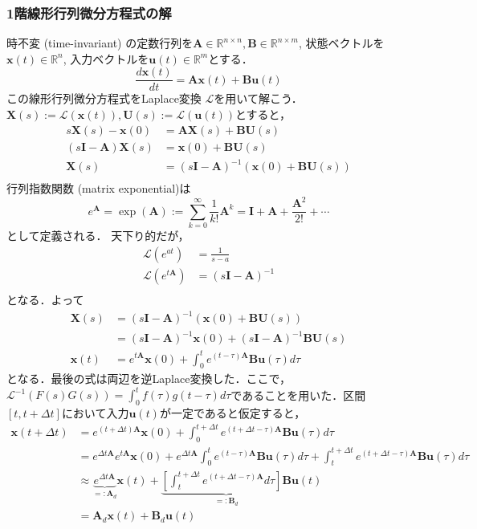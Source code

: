\subsubsection{1階線形行列微分方程式の解}時不変 (time-invariant) の定数行列を$\mathbf{A} \in \mathbb{R}^{n\times n}, \mathbf{B} \in \mathbb{R}^{n\times m}$, 状態ベクトルを$\mathbf{x}(t)\in\mathbb{R}^n$, 入力ベクトルを$\mathbf{u}(t)\in\mathbb{R}^m$とする．
$$
\frac{d\mathbf{x}(t)}{dt} = \mathbf{A}\mathbf{x}(t) + \mathbf{B}\mathbf{u}(t)
$$
この線形行列微分方程式をLaplace変換 $\mathcal{L}$を用いて解こう．$\boldsymbol{X}(s) := \mathcal{L}(\mathbf{x}(t)), \boldsymbol{U}(s) := \mathcal{L}(\mathbf{u}(t))$とすると，
$$
\begin{aligned}
s\boldsymbol{X}(s) - \mathbf{x}(0) &= \mathbf{A}\boldsymbol{X}(s)+ \mathbf{B}\boldsymbol{U}(s)\\
(s\mathbf{I} - \mathbf{A}) \boldsymbol{X}(s) &= \mathbf{x}(0) + \mathbf{B}\boldsymbol{U}(s)\\
\boldsymbol{X}(s) &= (s\mathbf{I} - \mathbf{A})^{-1}(\mathbf{x}(0) + \mathbf{B}\boldsymbol{U}(s))\\
\end{aligned}
$$
行列指数関数 (matrix exponential)は
$$
e^\mathbf{A} = \exp(\mathbf{A}) := \sum_{k=0}^\infty \frac{1}{k!}\mathbf{A}^k = \mathbf{I}+\mathbf{A}+\frac{\mathbf{A}^2}{2!}+\cdots
$$
として定義される．
天下り的だが，
$$
\begin{aligned}
\mathcal{L}(e^{at})&=\frac{1}{s-a}\\
\mathcal{L}(e^{t\mathbf{A}})&=(s\mathbf{I} - \mathbf{A})^{-1}\\
\end{aligned}
$$
となる．よって
$$
\begin{aligned}
\boldsymbol{X}(s) &= (s\mathbf{I} - \mathbf{A})^{-1}(\mathbf{x}(0) + \mathbf{B}\boldsymbol{U}(s))\\
&= (s\mathbf{I} - \mathbf{A})^{-1}\mathbf{x}(0) + (s\mathbf{I} - \mathbf{A})^{-1}\mathbf{B}\boldsymbol{U}(s)\\
\mathbf{x}(t)&=e^{t\mathbf{A}}\mathbf{x}(0)+\int_0^t e^{(t-\tau)\mathbf{A}}\mathbf{B}\mathbf{u}(\tau) d\tau
\end{aligned}
$$
となる．最後の式は両辺を逆Laplace変換した．ここで，$\mathcal{L}^{-1}(F(s)G(s))=\int_0^tf(\tau)g(t-\tau)d\tau$であることを用いた．区間$[t, t+\Delta t]$において入力$\mathbf{u}(t)$が一定であると仮定すると，
$$
\begin{aligned}
\mathbf{x}(t+\Delta t)&=e^{(t+\Delta t)\mathbf{A}}\mathbf{x}(0)+\int_0^{t+\Delta t} e^{(t+\Delta t-\tau)\mathbf{A}}\mathbf{B}\mathbf{u}(\tau) d\tau\\
&=e^{\Delta t\mathbf{A}}e^{t\mathbf{A}}\mathbf{x}(0)+e^{\Delta t\mathbf{A}}\int_0^{t} e^{(t-\tau)\mathbf{A}}\mathbf{B}\mathbf{u}(\tau) d\tau + \int_t^{t+\Delta t} e^{(t+\Delta t-\tau)\mathbf{A}}\mathbf{B}\mathbf{u}(\tau) d\tau\\
&\approx \underbrace{e^{\Delta t\mathbf{A}}}_{=: \mathbf{A}_d}\mathbf{x}(t)+\underbrace{\left[\int_t^{t+\Delta t} e^{(t+\Delta t-\tau)\mathbf{A}} d\tau\right] \mathbf{B}}_{=: \mathbf{B}_d}\mathbf{u}(t)\\
&=\mathbf{A}_d\mathbf{x}(t)+\mathbf{B}_d\mathbf{u}(t)\\
\end{aligned}
$$

